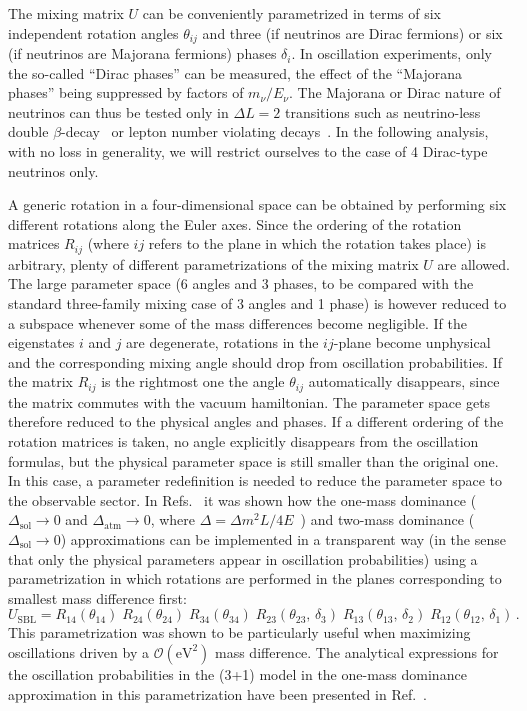\documentclass[12pt]{elsart}
\newcommand{\eVq}{\ensuremath{\text{eV}^2}}
\newcommand{\Dmq}{\Delta m^2}
\newcommand{\Sol}{\text{sol}}
\newcommand{\Atm}{\text{atm}}
\begin{document}
The mixing matrix $U$ can be conveniently parametrized in terms of six
independent rotation angles $\theta_{ij}$ and three (if neutrinos are
Dirac fermions) or six (if neutrinos are Majorana fermions) phases
$\delta_i$.  In oscillation experiments, only the so-called ``Dirac
phases'' can be measured, the effect of the ``Majorana phases'' being
suppressed by factors of $m_\nu / E_\nu$. The Majorana or Dirac nature
of neutrinos can thus be tested only in $\Delta L = 2$ transitions
such as neutrino-less double $\beta$-decay~\cite{Bilenky:2001xq} or
lepton number violating decays~\cite{Yao:2006px}. In the following
analysis, with no loss in generality, we will restrict ourselves to
the case of 4 Dirac-type neutrinos only.

A generic rotation in a four-dimensional space can be obtained by
performing six different rotations along the Euler axes. Since the
ordering of the rotation matrices $R_{ij}$ (where $ij$ refers to the
plane in which the rotation takes place) is arbitrary, plenty of
different parametrizations of the mixing matrix $U$ are allowed. The
large parameter space (6 angles and 3 phases, to be compared with the
standard three-family mixing case of 3 angles and 1 phase) is however
reduced to a subspace whenever some of the mass differences become
negligible.  If the eigenstates $i$ and $j$ are degenerate, rotations
in the $ij$-plane become unphysical and the corresponding mixing angle
should drop from oscillation probabilities. If the matrix $R_{ij}$ is
the rightmost one the angle $\theta_{ij}$ automatically disappears,
since the matrix commutes with the vacuum hamiltonian.  The parameter
space gets therefore reduced to the physical angles and phases.  If a
different ordering of the rotation matrices is taken, no angle
explicitly disappears from the oscillation formulas, but the physical
parameter space is still smaller than the original one. In this case,
a parameter redefinition is needed to reduce the parameter space to
the observable sector.  In Refs.~\cite{Donini:1999jc, Donini:1999he}
it was shown how the one-mass dominance ($\Delta_\Sol \to 0$ and
$\Delta_\Atm \to 0$, where $\Delta = \Dmq L / 4
E$~\cite{DeRujula:1979yy}) and two-mass dominance ($\Delta_\Sol \to
0$) approximations can be implemented in a transparent way (in the
sense that only the physical parameters appear in oscillation
probabilities) using a parametrization in which rotations are
performed in the planes corresponding to smallest mass difference
first:
%
\begin{equation}
    \label{eq:3+1param}
    U_\text{SBL} =
    R_{14}(\theta_{14}) \; R_{24}(\theta_{24}) \; R_{34}(\theta_{34}) \; 
    R_{23}(\theta_{23} ,\, \delta_3) \; R_{13}(\theta_{13} ,\, \delta_2) \;
    R_{12}(\theta_{12} ,\, \delta_1) \,.
\end{equation}
%
This parametrization was shown to be particularly useful when
maximizing oscillations driven by a $\mathcal{O}(\eVq)$ mass
difference. The analytical expressions for the oscillation
probabilities in the (3+1) model in the one-mass dominance
approximation in this parametrization have been presented in
Ref.~\cite{Donini:2001xy}. 
\end{document}

